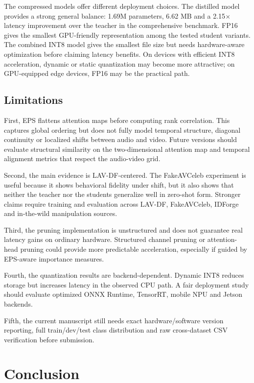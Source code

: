 \documentclass[pdflatex,sn-basic,Numbered]{sn-jnl}
\begin{document}
The compressed models offer different deployment choices. The distilled model provides a strong general balance: 1.69M parameters, 6.62 MB and a 2.15$\times$ latency improvement over the teacher in the comprehensive benchmark. FP16 gives the smallest GPU-friendly representation among the tested student variants. The combined INT8 model gives the smallest file size but needs hardware-aware optimization before claiming latency benefits. On devices with efficient INT8 acceleration, dynamic or static quantization may become more attractive; on GPU-equipped edge devices, FP16 may be the practical path.

\subsection{Limitations}\label{subsec:limitations}

First, EPS flattens attention maps before computing rank correlation. This captures global ordering but does not fully model temporal structure, diagonal continuity or localized shifts between audio and video. Future versions should evaluate structural similarity on the two-dimensional attention map and temporal alignment metrics that respect the audio-video grid.

Second, the main evidence is LAV-DF-centered. The FakeAVCeleb experiment is useful because it shows behavioral fidelity under shift, but it also shows that neither the teacher nor the students generalize well in zero-shot form. Stronger claims require training and evaluation across LAV-DF, FakeAVCeleb, IDForge and in-the-wild manipulation sources.

Third, the pruning implementation is unstructured and does not guarantee real latency gains on ordinary hardware. Structured channel pruning or attention-head pruning could provide more predictable acceleration, especially if guided by EPS-aware importance measures.

Fourth, the quantization results are backend-dependent. Dynamic INT8 reduces storage but increases latency in the observed CPU path. A fair deployment study should evaluate optimized ONNX Runtime, TensorRT, mobile NPU and Jetson backends.

Fifth, the current manuscript still needs exact hardware/software version reporting, full train/dev/test class distribution and raw cross-dataset CSV verification before submission.

\section{Conclusion}\label{sec:conclusion}
\end{document}
